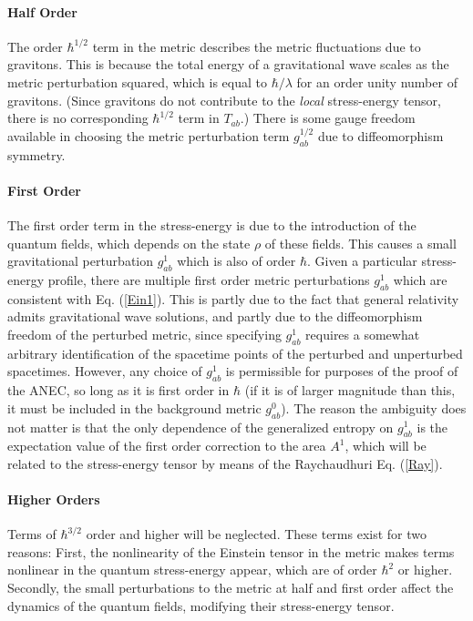 \documentclass{article}
\begin{document}
\paragraph{Half Order}
The order $\hbar^{1/2}$ term in the metric describes the metric fluctuations due to gravitons.  This is because the total energy of a gravitational wave scales as the metric perturbation squared, which is equal to $\hbar / \lambda$ for an order unity number of gravitons.  (Since gravitons do not contribute to the \emph{local} stress-energy tensor, there is no corresponding $\hbar^{1/2}$ term in $T_{ab}$.)  There is some gauge freedom available in choosing the metric perturbation term $g_{ab}^{1/2}$ due to diffeomorphism symmetry.

\paragraph{First Order}
The first order term in the stress-energy is due to the introduction of the quantum fields, which depends on the state $\rho$ of these fields.  This causes a small gravitational perturbation $g_{ab}^{1}$ which is also of order $\hbar$.  Given a particular stress-energy profile, there are multiple first order metric perturbations $g_{ab}^{1}$ which are consistent with Eq. (\ref{Ein1}).  This is partly due to the fact that general relativity admits gravitational wave solutions, and partly due to the diffeomorphism freedom of the perturbed metric, since specifying $g_{ab}^{1}$ requires a somewhat arbitrary identification of the spacetime points of the perturbed and unperturbed spacetimes.  However, any choice of $g_{ab}^{1}$ is permissible for purposes of the proof of the ANEC, so long as it is first order in $\hbar$ (if it is of larger magnitude than this, it must be included in the background metric $g_{ab}^{0}$).  The reason the ambiguity does not matter is that the only dependence of the generalized entropy on $g_{ab}^{1}$ is the expectation value of the first order correction to the area $A^{1}$, which will be related to the stress-energy tensor by means of the Raychaudhuri Eq. (\ref{Ray}).

\paragraph{Higher Orders}
Terms of $\hbar^{3/2}$ order and higher will be neglected.  These terms exist for two reasons:  First, the nonlinearity of the Einstein tensor in the metric makes terms nonlinear in the quantum stress-energy appear, which are of order $\hbar^2$ or higher.  Secondly, the small perturbations to the metric at half and first order affect the dynamics of the quantum fields, modifying their stress-energy tensor.  
\end{document}
